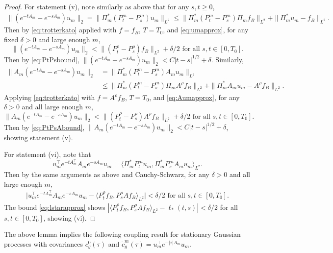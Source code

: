 \begin{proof}
For statement (v), note similarly as above that for any $s,t \geq 0$,
\begin{align*}
\|(e^{-tA_m}-e^{-sA_m})u_m\|_2
=\|\Pi_m^*(P_t^m-P_s^m)u_m\|_{L^2}
\leq \|\Pi_m^*(P_t^m-P_s^m)\Pi_mf_B\|_{L^2}+\|\Pi_m^* u_m-f_B\|_{L^2}.
\end{align*}
Then by \eqref{eq:trotterkato} applied with $f=f_B$, $T=T_0$,
and \eqref{eq:umapprox}, for any fixed $\delta>0$ and large enough $m$,
\[\|(e^{-tA_m}-e^{-sA_m})u_m\|_2<\|(P_t^\rho-P_s^\rho)f_B\|_{L^2}+\delta/2
\text{ for all } s,t \in [0,T_0].\]
Then by \eqref{eq:PtPsbound}, 
$\|(e^{-tA_m}-e^{-sA_m})u_m\|_2<C|t-s|^{1/2}+\delta$. Similarly, 
\begin{align*}
\|A_m(e^{-tA_m}-e^{-sA_m})u_m\|_2
&=\|\Pi_m^*(P_t^m-P_s^m)A_mu_m\|_{L^2}\\
&\leq \|\Pi_m^*(P_t^m-P_s^m)\Pi_m A^\rho f_B\|_{L^2}+\|\Pi_m^* A_mu_m-A^\rho f_B\|_{L^2}.
\end{align*}
Applying \eqref{eq:trotterkato} with $f=A^\rho f_B$, $T=T_0$, and
\eqref{eq:Aumapprox}, for any $\delta>0$ and all large enough $m$,
\[\|A_m(e^{-tA_m}-e^{-sA_m})u_m\|_2<
\|(P_t^\rho-P_s^\rho)A^\rho f_B\|_{L^2}+\delta/2 \text{ for all } s,t \in [0,T_0].\]
Then by \eqref{eq:PtPsAbound},
$\|A_m(e^{-tA_m}-e^{-sA_m})u_m\|_2<C|t-s|^{1/2}+\delta$,
showing statement (v).

For statement (vi), note that
\[u_m^\top e^{-tA_m^\top}A_me^{-sA_m}u_m
=\langle \Pi_m^* P_t^m u_m,\Pi_m^*P_s^mA_mu_m \rangle_{L^2}.\]
Then by the same arguments as above and Cauchy-Schwarz,
for any $\delta>0$ and all large enough $m$, 
\begin{align*}
\Big|u_m^\top e^{-tA_m^\top}A_me^{-sA_m}u_m
-\langle P_t^\rho f_B,P_s^\rho A f_B \rangle_{L^2}\Big|<\delta/2
\text{ for all } s,t \in [0,T_0].
\end{align*}
The bound \eqref{eq:lstarapprox} shows
$|\langle P_t^\rho f_B,P_s^\rho Af_B \rangle_{L^2}-\ell_*(t,s)|<\delta/2$
for all $s,t \in [0,T_0]$, showing (vi).
\end{proof}

The above lemma implies the following coupling result for stationary
Gaussian processes with covariances $c_g^0(\tau)$ and $\tilde c_g^m(\tau)=u_m^\top e^{-|\tau|A_m}u_m$.

